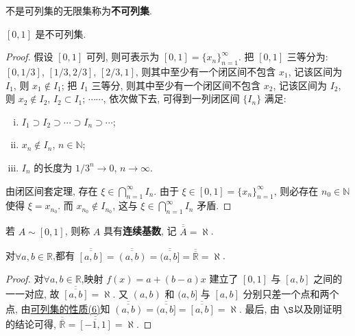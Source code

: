 \documentclass[../../main.tex]{subfiles}
\begin{document}
\begin{definition}[不可列集]
不是可列集的无限集称为\textbf{不可列集}.
\end{definition}

\begin{theorem}
$[0, 1]$ 是不可列集.
\end{theorem}
\begin{proof}
假设 $[0, 1]$ 可列, 则可表示为 $[0, 1] = \{x_n\}_{n = 1}^{\infty}$.
把 $[0, 1]$ 三等分为: $[0, 1/3]$, $[1/3, 2/3]$, $[2/3, 1]$, 则其中至少有一个闭区间不包含 $x_1$, 记该区间为 $I_1$, 则 $x_1 \notin I_1$; 把 $I_1$ 三等分, 则其中至少有一个闭区间不包含 $x_2$, 记该区间为 $I_2$, 则 $x_2 \notin I_2$, $I_2 \subset I_1$; $\cdots\cdots$, 依次做下去, 可得到一列闭区间 $\{I_n\}$ 满足:
\begin{enumerate}[(i)]
\item $I_1 \supset I_2 \supset \cdots \supset I_n \supset \cdots$;
\item $x_n \notin I_n$, $n \in \mathbb{N}$;
\item $I_n$ 的长度为 $1/3^n \to 0$, $n \to \infty$.
\end{enumerate}
由闭区间套定理, 存在 $\xi \in \bigcap_{n = 1}^{\infty} I_n$. 由于 $\xi \in [0, 1] = \{x_n\}_{n = 1}^{\infty}$, 则必存在 $n_0 \in \mathbb{N}$ 使得 $\xi = x_{n_0}$. 而 $x_{n_0} \notin I_{n_0}$, 这与 $\xi \in \bigcap_{n = 1}^{\infty} I_n$ 矛盾. 
\end{proof}

\begin{definition}
若 $A \sim [0, 1]$, 则称 $A$ 具有\textbf{连续基数}, 记 $\overline{\overline{A}} = \aleph$.
\end{definition}

\begin{theorem}
对$\forall a,b\in \mathbb{R}$,都有
$\overline{\overline{[a, b]}} = \overline{\overline{(a, b)}} = \overline{\overline{(a, b]}} = \overline{\overline{\mathbb{R}}} = \aleph$.
\end{theorem}
\begin{proof}
对$\forall a,b\in \mathbb{R}$,映射 $f(x) = a + (b - a)x$ 建立了 $[0, 1]$ 与 $[a, b]$ 之间的一一对应, 故 $\overline{\overline{[a, b]}} = \aleph$. 又 $(a, b)$ 和 $(a, b]$ 与 $[a, b]$ 分别只差一个点和两个点, 由\hyperref[proposition:可列集的性质]{可列集的性质(6)}知 $\overline{\overline{(a, b)}} = \overline{\overline{(a, b]}} = \overline{\overline{[a, b]}} = \aleph$. 最后, 由 $\S$以及刚证明的结论可得, $\overline{\overline{\mathbb{R}}} = \overline{\overline{[-1, 1]}} = \aleph$.
\end{proof}
\end{document}
